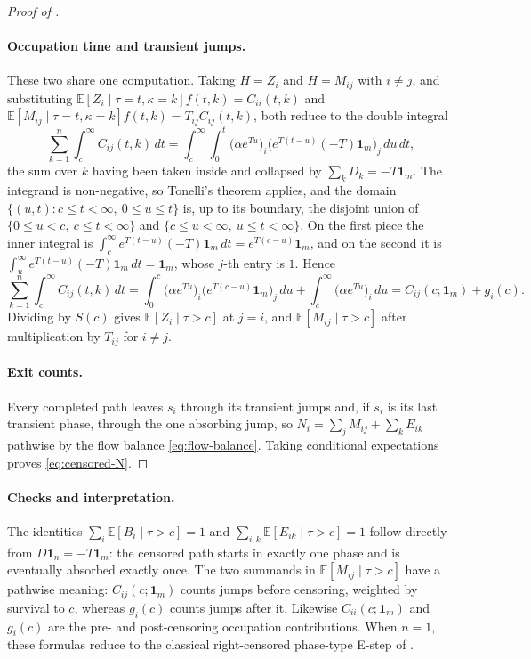 \documentclass{article}
\newcommand{\ex}[1]{\mathbb{E}\left[#1\right]}
\newcommand{\subchg}[1]{#1}
\begin{document}
\begin{proof}[Proof of ]
\paragraph{Occupation time and transient jumps.} \subchg{These two share one computation. Taking $H=Z_i$ and $H=M_{ij}$ with $i \ne j$, and substituting $\ex{Z_i\mid\tau=t,\kappa=k}f(t,k)=C_{ii}(t,k)$ and $\ex{M_{ij}\mid\tau=t,\kappa=k}f(t,k)=T_{ij}C_{ij}(t,k)$, both reduce to the double integral}
\[
\sum_{k=1}^n\int_c^\infty C_{ij}(t,k)\,dt
 =\int_c^\infty\!\!\int_0^t
   \big(\alpha e^{Tu}\big)_i
   \big(e^{T(t-u)}(-T)\mathbf 1_m\big)_j\,du\,dt ,
\]
\subchg{the sum over $k$ having been taken inside and collapsed by $\sum_kD_k=-T\mathbf 1_m$. The integrand is non-negative, so Tonelli's theorem applies, and the domain $\{(u,t):c\le t<\infty,\ 0\le u\le t\}$ is, up to its boundary, the disjoint union of $\{0\le u<c,\ c\le t<\infty\}$ and $\{c\le u<\infty,\ u\le t<\infty\}$. On the first piece the inner integral is $\int_c^\infty e^{T(t-u)}(-T)\mathbf 1_m\,dt = e^{T(c-u)}\mathbf 1_m$, and on the second it is $\int_u^\infty e^{T(t-u)}(-T)\mathbf 1_m\,dt = \mathbf 1_m$, whose $j$-th entry is $1$. Hence}
\[
\sum_{k=1}^n\int_c^\infty C_{ij}(t,k)\,dt
 =\int_0^c \big(\alpha e^{Tu}\big)_i\big(e^{T(c-u)}\mathbf 1_m\big)_j\,du
  +\int_c^\infty \big(\alpha e^{Tu}\big)_i\,du
 =C_{ij}(c;\mathbf 1_m)+g_i(c) .
\]
\subchg{Dividing by $S(c)$ gives $\ex{Z_i\mid\tau>c}$ at $j=i$, and $\ex{M_{ij}\mid\tau>c}$ after multiplication by $T_{ij}$ for $i\neq j$.}

\paragraph{Exit counts.} \subchg{Every completed path leaves $s_i$ through its transient jumps and, if $s_i$ is its last transient phase, through the one absorbing jump, so $N_i=\sum_jM_{ij}+\sum_kE_{ik}$ pathwise by the flow balance \eqref{eq:flow-balance}. Taking conditional expectations proves \eqref{eq:censored-N}.}
\end{proof}


\paragraph{Checks and interpretation.}
\subchg{The identities $\sum_i\ex{B_i\mid\tau>c}=1$ and $\sum_{i,k}\ex{E_{ik} \mid \tau>c}=1$ follow directly from $D\mathbf 1_n=-T\mathbf 1_m$: the censored path starts in exactly one phase and is eventually absorbed exactly once. The two summands in $\ex{M_{ij} \mid \tau>c}$ have a pathwise meaning: $C_{ij}(c;\mathbf 1_m)$ counts jumps before censoring, weighted by survival to $c$, whereas $g_i(c)$ counts jumps after it. Likewise $C_{ii}(c;\mathbf 1_m)$ and $g_i(c)$ are the pre- and post-censoring occupation contributions.} When $n=1$, these formulas reduce to the classical right-censored phase-type E-step of \citet{Olsson_1996_censored}.
\end{document}
